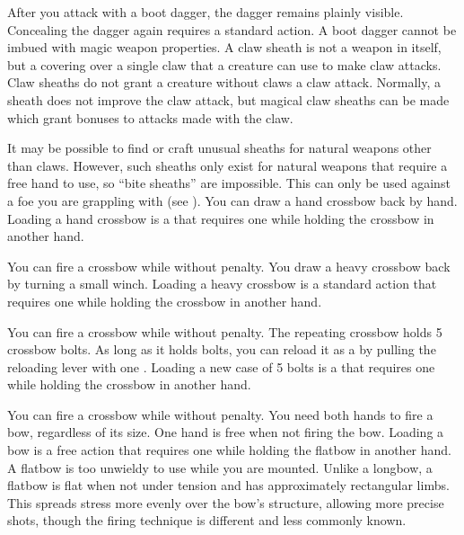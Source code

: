         After you attack with a boot dagger, the dagger remains plainly visible.
        Concealing the dagger again requires a standard action.
        A boot dagger cannot be imbued with magic weapon properties.
         A claw sheath is not a weapon in itself, but a covering over a single claw that a creature can use to make claw attacks. Claw sheaths do not grant a creature without claws a claw attack. Normally, a sheath does not improve the claw attack, but magical claw sheaths can be made which grant bonuses to attacks made with the claw.

        It may be possible to find or craft unusual sheaths for natural weapons other than claws.
        However, such sheaths only exist for natural weapons that require a free hand to use, so ``bite sheaths'' are impossible.
         This  can only be used against a foe you are grappling with (see ).
         You can draw a hand crossbow back by hand. Loading a hand crossbow is a  that requires one  while holding the crossbow in another hand.
        \par You can fire a crossbow while \prone without penalty.
         You draw a heavy crossbow back by turning a small winch.
        Loading a heavy crossbow is a standard action that requires one  while holding the crossbow in another hand.
        \par You can fire a crossbow while \prone without penalty.
         The repeating crossbow holds 5 crossbow bolts. As long as it holds bolts, you can reload it as a  by pulling the reloading lever with one . Loading a new case of 5 bolts is a  that requires one  while holding the crossbow in another hand.
        \par You can fire a crossbow while \prone without penalty.
         You need both hands to fire a bow, regardless of its size. One hand is free when not firing the bow. Loading a bow is a free action that requires one  while holding the flatbow in another hand. A flatbow is too unwieldy to use while you are mounted.
        Unlike a longbow, a flatbow is flat when not under tension and has approximately rectangular limbs.
        This spreads stress more evenly over the bow's structure, allowing more precise shots, though the firing technique is different and less commonly known.
